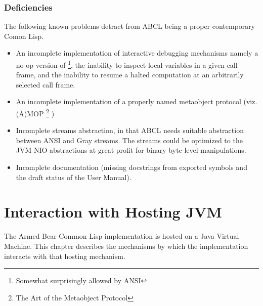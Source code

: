 \documentclass[10pt]{book}
\begin{document}
\subsection{Deficiencies}
The following known problems detract from \textsc{ABCL} being a proper
contemporary Comon Lisp.
\begin{itemize}

  \item An incomplete implementation of interactive debugging
    mechanisms namely a no-op version of
     \footnote{Somewhat surprisingly allowed by
      \textsc{ANSI}}, the inability to inspect local variables in a
    given call frame, and the inability to resume a halted computation
    at an arbitrarily selected call frame.

  \item An incomplete implementation of a properly named metaobject
    protocol (viz. (A)MOP \footnote{The Art of the  Metaobject Protocol} )


  \item Incomplete streams abstraction, in that \textsc{ABCL} needs suitable
    abstraction between ANSI and Gray streams.  The streams could be
    optimized to the JVM NIO abstractions at great profit for binary
    byte-level manipulations.
    
  \item Incomplete documentation (missing docstrings from exported
    symbols and the draft status of the User Manual).

\end{itemize}

\chapter{Interaction with Hosting JVM}

%

The Armed Bear Common Lisp implementation is hosted on a Java Virtual
Machine.  This chapter describes the mechanisms by which the
implementation interacts with that hosting mechanism.
\end{document}

